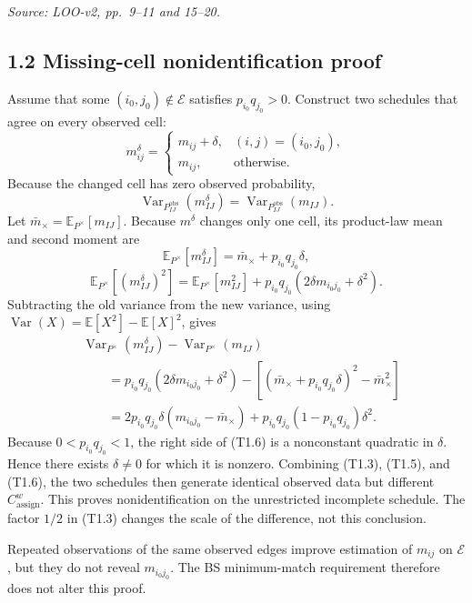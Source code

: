 \documentclass[11pt]{article}
\begin{document}
\textit{Source: LOO-v2, pp.\ 9--11 and 15--20.}

\subsection{1.2 Missing-cell nonidentification proof}

Assume that some \((i_0,j_0)\notin\mathcal E\) satisfies
\(p_{i_0}q_{j_0}>0\).  Construct two schedules that agree on every observed
cell:
\[
m^\delta_{ij}
=
\begin{cases}
m_{ij}+\delta,&(i,j)=(i_0,j_0),\\
m_{ij},&\text{otherwise}.
\end{cases}
\tag{T1.4}
\]
Because the changed cell has zero observed probability,
\[
\operatorname{Var}_{P^{\mathrm{obs}}_{IJ}}(m^\delta_{IJ})
=
\operatorname{Var}_{P^{\mathrm{obs}}_{IJ}}(m_{IJ}).
\tag{T1.5}
\]
Let \(\bar m_\times=\mathbb E_{P^\times}[m_{IJ}]\).  Because
\(m^\delta\) changes only one cell, its product-law mean and second moment are
\[
\mathbb E_{P^\times}[m^\delta_{IJ}]
=
\bar m_\times+p_{i_0}q_{j_0}\delta,
\tag{T1.5a}
\]
\[
\mathbb E_{P^\times}[(m^\delta_{IJ})^2]
=
\mathbb E_{P^\times}[m_{IJ}^2]
+p_{i_0}q_{j_0}
\left(2\delta m_{i_0j_0}+\delta^2\right).
\tag{T1.5b}
\]
Subtracting the old variance from the new variance, using
\(\operatorname{Var}(X)=\mathbb E[X^2]-\mathbb E[X]^2\), gives
\[
\begin{aligned}
&\operatorname{Var}_{P^\times}(m^\delta_{IJ})
-\operatorname{Var}_{P^\times}(m_{IJ})\\
&\qquad =
p_{i_0}q_{j_0}(2\delta m_{i_0j_0}+\delta^2)
-\left[
(\bar m_\times+p_{i_0}q_{j_0}\delta)^2-\bar m_\times^2
\right]\\
&\qquad =
2p_{i_0}q_{j_0}\delta(m_{i_0j_0}-\bar m_\times)
+p_{i_0}q_{j_0}(1-p_{i_0}q_{j_0})\delta^2.
\end{aligned}
\tag{T1.6}
\]
Because \(0<p_{i_0}q_{j_0}<1\), the right side of (T1.6) is a nonconstant
quadratic in \(\delta\).  Hence there exists \(\delta\neq0\) for which it is
nonzero.  Combining (T1.3), (T1.5), and (T1.6), the two schedules then
generate identical observed data but different
\(C^w_{\mathrm{assign}}\).  This proves nonidentification on the unrestricted
incomplete schedule.  The factor \(1/2\) in (T1.3) changes the scale of the
difference, not this conclusion.

Repeated observations of the same observed edges improve estimation of
\(m_{ij}\) on \(\mathcal E\), but they do not reveal
\(m_{i_0j_0}\).  The BS minimum-match requirement therefore does not alter
this proof.
\end{document}
